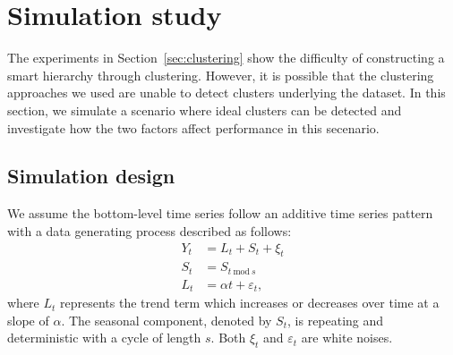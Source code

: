 \documentclass[a4paper,review,12pt,authoryear]{elsarticle}
\begin{document}
\section{Simulation study}
\label{sec:simulation}

The experiments in Section~\ref{sec:clustering} show the difficulty of constructing a smart hierarchy through clustering. However, it is possible that the clustering approaches we used are unable to detect clusters underlying the dataset. 
In this section, we simulate a scenario where ideal clusters can be detected and investigate how the two factors affect performance in this secenario.


\subsection{Simulation design}


We assume the bottom-level time series follow an additive time series pattern with a data generating process described as follows:
\begin{equation}
    \label{simu:DGP}
    \begin{aligned}
    Y_t &= L_t + S_t + \xi_t \\
    S_t &= S_{t~\text{mod}~s} \\
    L_t &= \alpha t + \varepsilon_t,
    \end{aligned}
\end{equation}
where $L_t$ represents the trend term which increases or decreases over time at a slope of $\alpha$. The seasonal component, denoted by $S_t$, is repeating and deterministic with a cycle of length $s$. Both $\xi_t$ and $\varepsilon_t$ are white noises.
\end{document}

